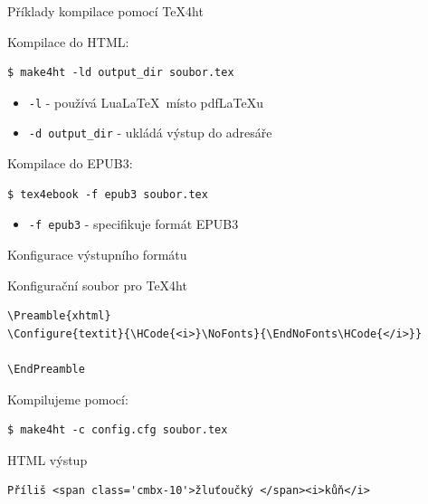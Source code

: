 \begin{frame}[fragile]{Příklady kompilace pomocí TeX4ht}

\begin{block}{Kompilace do HTML:}
\begin{verbatim}
$ make4ht -ld output_dir soubor.tex
\end{verbatim}
\end{block}



\begin{itemize}
    \item \texttt{-l} - používá Lua\LaTeX\ místo pdf\LaTeX u
    \item \texttt{-d output\_dir} - ukládá výstup do adresáře
\end{itemize}

\begin{block}{Kompilace do EPUB3:}
\begin{verbatim}
$ tex4ebook -f epub3 soubor.tex
\end{verbatim}
\end{block}

\begin{itemize}
    \item \texttt{-f epub3} - specifikuje formát EPUB3
\end{itemize}
\end{frame}

\begin{frame}[fragile]{Konfigurace výstupního formátu}
\begin{block}{Konfigurační soubor pro \TeX4ht}
\begin{verbatim}
\Preamble{xhtml}
\Configure{textit}{\HCode{<i>}\NoFonts}{\EndNoFonts\HCode{</i>}}

\EndPreamble
\end{verbatim}
\end{block}

\begin{block}{Kompilujeme pomocí:}
\begin{verbatim}
$ make4ht -c config.cfg soubor.tex
\end{verbatim}
\end{block}

\begin{block}{HTML výstup}
\begin{verbatim}
Příliš <span class='cmbx-10'>žluťoučký </span><i>kůň</i>  
\end{verbatim}
\end{block}
\end{frame}

